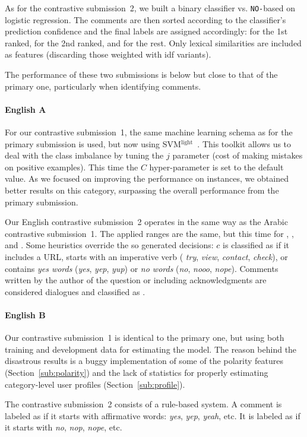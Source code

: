 As for the contrastive submission~2, we built a binary classifier \dir vs. 
\texttt{NO-}\dir based on logistic regression. The comments are then sorted 
according to the classifier's prediction confidence and the final labels are 
assigned accordingly: \dir for the 1st ranked, \rel for the 2nd ranked, and 
\irel for the rest. Only lexical similarities are included as features 
(discarding those weighted with idf variants).


The performance of these two submissions is below but close to that of the 
primary one, particularly when identifying \rel comments. 

\paragraph{English A}

For our contrastive submission~1, the same machine learning schema as for the 
primary submission is used, but now using 
SVM$^\mathrm{light}$~\cite{Joachims:99}. This toolkit allows us to deal with 
the class imbalance by tuning the $j$ parameter (cost of making mistakes on 
positive examples). This time the $C$ hyper-parameter is set to the default 
value. As we focused on improving the performance on \pot instances, we 
obtained better results on this category, surpassing the overall performance 
from the primary submission.

Our English contrastive submission~2 operates in the same way as the Arabic 
contrastive submission~1. The applied ranges are the same, but this time for 
\good, \pot, and \bad. Some heuristics override the so generated decisions: $c$ 
is classified as \good if it includes a URL, starts with an imperative verb (\eg 
\textit{try}, \textit{view}, \textit{contact}, \textit{check}), or contains 
\textit{yes words} (\eg \textit{yes}, \textit{yep}, \textit{yup}) or \textit{no 
words} (\eg \textit{no}, \textit{nooo}, \textit{nope}). Comments written by the 
author of the question or including acknowledgments are considered dialogues and 
classified as \bad. 

\paragraph{English B}

Our contrastive submission~1 is identical to the primary one, but using both 
training and development data for estimating the model. The reason behind the 
disastrous results is a buggy implementation of some of the polarity features 
(\cf Section~\ref{sub:polarity}) and the lack of statistics for properly 
estimating category-level user profiles (\cf Section~\ref{sub:profile}). 
 
 
The contrastive submission~2 consists of a rule-based system. A comment is 
labeled as \yes if it starts with affirmative words: \textit{yes}, \textit{yep}, 
\textit{yeah}, etc. It is labeled as \no if it starts with \textit{no}, 
\textit{nop}, \textit{nope}, etc. 

